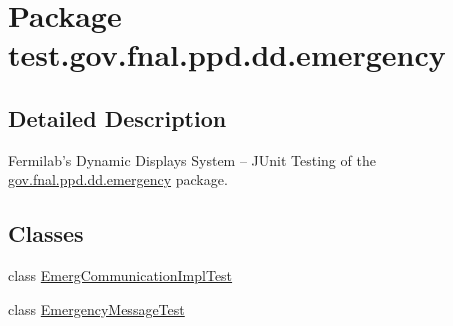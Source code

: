 \hypertarget{namespacetest_1_1gov_1_1fnal_1_1ppd_1_1dd_1_1emergency}{\section{Package test.\-gov.\-fnal.\-ppd.\-dd.\-emergency}
\label{namespacetest_1_1gov_1_1fnal_1_1ppd_1_1dd_1_1emergency}
}


\subsection{Detailed Description}
Fermilab's Dynamic Displays System -- J\-Unit Testing of the \hyperlink{namespacetest_1_1gov_1_1fnal_1_1ppd_1_1dd_1_1emergency}{gov.\-fnal.\-ppd.\-dd.\-emergency} package.\subsection*{Classes}
\begin{DoxyCompactItemize}
\item 
class \hyperlink{classtest_1_1gov_1_1fnal_1_1ppd_1_1dd_1_1emergency_1_1EmergCommunicationImplTest}{Emerg\-Communication\-Impl\-Test}
\item 
class \hyperlink{classtest_1_1gov_1_1fnal_1_1ppd_1_1dd_1_1emergency_1_1EmergencyMessageTest}{Emergency\-Message\-Test}
\end{DoxyCompactItemize}
